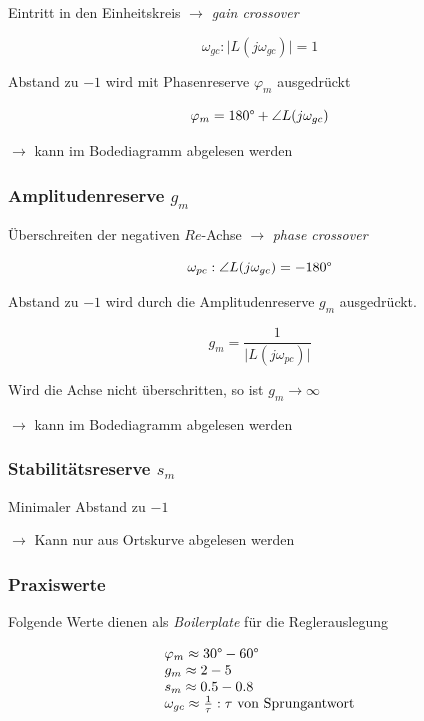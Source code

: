 \documentclass[
  10pt,
  a4paper,
]{article}
\numberwithin{equation}{section}
\begin{document}
\begin{multicols}{2}
Eintritt in den Einheitskreis \(\rightarrow\) \emph{gain crossover}

\[
\omega_{gc} : \lvert L(j\omega_{gc})\rvert = 1
\]

Abstand zu \(-1\) wird mit Phasenreserve \(\varphi_m\) ausgedrückt

\[
\varphi_m = 180\degree+\angle L(j\omega_{gc})
\]

\(\rightarrow\) kann im Bodediagramm abgelesen werden

\hypertarget{amplitudenreserve-g_m}{%
\subsubsection{\texorpdfstring{Amplitudenreserve
\(g_m\)}{Amplitudenreserve g\_m}}\label{amplitudenreserve-g_m}}

Überschreiten der negativen \(Re\)-Achse \(\rightarrow\) \emph{phase
crossover}

\[
\omega_{pc} : \angle L(j\omega_{gc})= -180\degree
\]

Abstand zu \(-1\) wird durch die Amplitudenreserve \(g_m\) ausgedrückt.

\[
g_m = \frac1{\lvert L(j\omega_{pc})\rvert}
\]

Wird die Achse nicht überschritten, so ist \(g_m\rightarrow\infty\)

\(\rightarrow\) kann im Bodediagramm abgelesen werden

\hypertarget{stabilituxe4tsreserve-s_m}{%
\subsubsection{\texorpdfstring{Stabilitätsreserve
\(s_m\)}{Stabilitätsreserve s\_m}}\label{stabilituxe4tsreserve-s_m}}

Minimaler Abstand zu \(-1\)

\(\rightarrow\) Kann nur aus Ortskurve abgelesen werden

\hypertarget{praxiswerte}{%
\subsubsection{Praxiswerte}\label{praxiswerte}}

Folgende Werte dienen als \emph{Boilerplate} für die Reglerauslegung

\[
\begin{array}{l}
\varphi_m \approx 30\degree - 60\degree\\
g_m \approx 2-5 \\
s_m \approx 0.5 - 0.8 \\
\omega_{gc} \approx\frac1{\tau}: \tau\text{ von Sprungantwort}
\end{array}
\]


\end{multicols}
\end{document}
